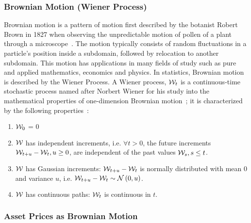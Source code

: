 \subsubsection{Brownian Motion (Wiener Process)}

Brownian motion is a pattern of motion first described by the botanist Robert Brown in 1827 when observing the unpredictable motion of pollen of a plant through a microscope~\cite{pearle2010brown}. The motion typically consists of random fluctuations in a particle's position inside a subdomain, followed by relocation to another subdomain. This motion has applications in many fields of study such as pure and applied mathematics, economics and physics. In statistics, Brownian motion is described by the Wiener Process.
\nline{}
A Wiener process, \( \mathcal{W}_t \) is a continuous-time stochastic process named after Norbert Wiener for his study into the mathematical properties of one-dimension Brownian motion~\cite{wiener1976norbert}; it is characterized by the following properties~\cite{durrett2019probability}:

\begin{enumerate}
    \item \( \mathcal{W}_0 \) = 0
    \item \( \mathcal{W} \) has independent increments, i.e. \( \forall t>0 \), the future increments \( \mathcal{W}_{t+u} - \mathcal{W}_t, u \geq 0 \), are independent of the past values \( \mathcal{W}_s, s \leq t \).
    \item\label{Weiner process Gaussian increments} \( \mathcal{W} \) has Gaussian increments: \( \mathcal{W}_{t+u} - \mathcal{W}_t \) is normally distributed with mean 0 and variance \( u \), i.e. \hfill\break{} \( \mathcal{W}_{t+u} - \mathcal{W}_t \sim \mathcal{N}\left(0, u\right)\).
    \item \( \mathcal{W} \) has continuous paths: \( \mathcal{W}_t \) is continuous in \( t \).
\end{enumerate}

\subsubsection{Asset Prices as Brownian Motion}


